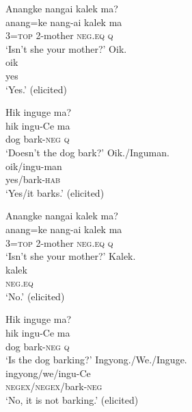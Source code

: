 \documentclass[output=paper,colorlinks,citecolor=brown]{langscibook}
\begin{document}
\ea\label{ex:amr:41} 
    \begin{xlist}
     Anangke nangai kalek ma?\\
        \gll  anang=ke nang-ai kalek ma\\ 
            3=\textsc{top} 2-mother \textsc{neg}.\textsc{eq} \textsc{q}\\
        \glt ‘Isn’t she your mother?'
     Oik.\\
        \gll oik \\
               {yes}\\
        \glt ‘Yes.' (elicited)
    \end{xlist}
    \z
\ea\label{ex:amr:42} 
    \begin{xlist}
      Hik inguge ma?\\
        \gll  hik ingu-Ce ma\\ 
            dog bark-\textsc{neg} \textsc{q}\\
        \glt ‘Doesn’t the dog bark?'
      Oik./Inguman.\\ 
        \gll oik/ingu-man\\
                yes/bark\textsc{{}-hab}\\
        \glt ‘Yes/it barks.’ (elicited)
    \end{xlist}
    \z


\ea\label{ex:amr:43}
    \begin{xlist}
     Anangke nangai kalek ma?\\ 
        \gll  anang=ke nang-ai kalek ma\\ 
             3=\textsc{top} 2-mother \textsc{neg}.\textsc{eq} \textsc{q}\\
        \glt ‘Isn’t she your mother?'
      Kalek.\\ 
        \gll kalek\\
              \textsc{neg}.\textsc{eq} \\
        \glt ‘No.' (elicited)
    \end{xlist}
\z
    \ea\label{ex:amr:44}
    \begin{xlist}
     Hik inguge ma?\\ 
        \gll  hik ingu-Ce ma\\ 
             dog bark-\textsc{neg} \textsc{q}\\
        \glt ‘Is the dog barking?'
     Ingyong./We./Inguge.\\
        \gll  ingyong/we/ingu-Ce\\
                \textsc{negex/}\textsc{negex/}bark\textsc{{}-neg}\\
        \glt ‘No, it is not barking.’ (elicited)
    \end{xlist}
\z
\end{document}
